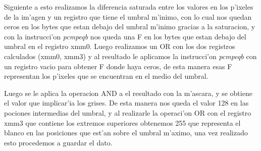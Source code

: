 Siguiente a esto realizamos la diferencia saturada entre los valores en los p'ixeles de la im'agen y un registro que tiene 
el umbral m'inimo, con lo cual nos quedan ceros en los bytes que estan debajo del umbral m'inimo gracias a la saturacion,
y con la instrucci'on \textit{pcmpeqb} nos queda una F en los bytes que estan debajo del umbral en el registro xmm0.
Luego realizamos un OR con los dos registros calculados (xmm0, xmm3) y al resultado le aplicamos la instrucci'on \textit{pcmpeqb} con
un registro vacio para obtener F donde haya ceros, de esta manera esas F representan los p'ixeles que se encuentran en el 
medio del umbral.

Luego se le aplica la operacion AND a el resultado con la m'ascara, y se obtiene el valor que implicar'ia los grises.
De esta manera nos queda el valor 128 en las pociones intermedias del umbral, y al realizarle la operaci'on OR con el registro 
xmm3 que contiene los extremos superiores obtenemos 255 que representa el blanco en las posiciones que est'an sobre el umbral 
m'aximo, una vez realizado esto procedemos a guardar el dato.